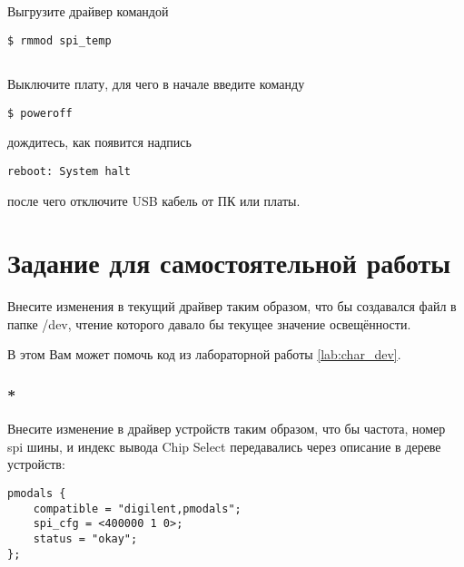 \subsection{}Выгрузите драйвер командой
\begin{lstlisting}[style=bash]
$ rmmod spi_temp
\end{lstlisting}

\subsection{} Выключите плату, для чего в начале введите команду
\begin{lstlisting}[style=bash]
	$ poweroff
\end{lstlisting}
дождитесь, как появится надпись
\begin{lstlisting}[style=stdout]
	reboot: System halt
\end{lstlisting}
после чего отключите USB кабель от ПК или платы. 

\section{Задание для самостоятельной работы}
Внесите изменения в текущий драйвер таким образом, что бы создавался файл в папке /dev, чтение которого давало бы текущее значение освещённости.

В этом Вам может помочь код из лабораторной работы \ref{lab:char_dev}.

\subsubsection{*}
Внесите изменение в драйвер устройств таким образом, что бы частота, номер spi шины, и индекс вывода Chip Select передавались через описание в дереве устройств:
\begin{lstlisting}[style=stdout]
pmodals {
	compatible = "digilent,pmodals";
	spi_cfg = <400000 1 0>;	  
	status = "okay";
};
\end{lstlisting}